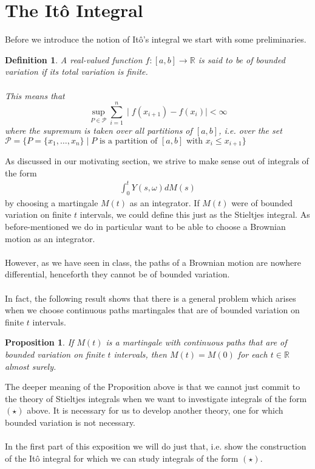 \documentclass[11pt,a4paper, final]{article}
\newtheorem{prop}{Proposition}[section]
\newtheorem{defn}{Definition}[section]
\begin{document}
\section{The Itô Integral}
Before we introduce the notion of Itô's integral we start with some preliminaries.
\begin{defn}
A real-valued function $f: [a,b] \rightarrow \mathbb{R}$ is said to be of \textit{bounded variation} if its total variation is finite.\\
\\ This means that 
$$ \sup_{P \in \mathcal{P}} \sum \limits_{i=1}^n \mid f(x_{i+1})-f(x_i)\mid < \infty $$
where the supremum is taken over all partitions of $[a,b]$, i.e. over the set \\  $\mathcal{P}= \lbrace P = \lbrace x_1 , \dots , x_n \rbrace \mid P \text{ is a partition of $[a,b]$ with $x_i \leq x_{i+1}$} \rbrace$
\end{defn}

\noindent As discussed in our motivating section, we strive to make sense out of integrals of the form 
\begin{align*}
\int_0^t Y(s, \omega) dM(s) \tag{$\star$} 
\end{align*} by choosing a martingale $M(t)$ as an integrator. If $M(t)$ were of bounded variation on finite $t$ intervals, we could define this just as the Stieltjes integral. As before-mentioned we do in particular want to be able to choose a Brownian motion as an integrator. 
\\\\
However, as we have seen in class, the paths of a Brownian motion are nowhere differential, henceforth they cannot be of bounded variation. \\
\\
In fact, the following result shows that there is a general problem which arises when we choose continuous paths martingales that are of bounded variation on finite $t$ intervals.
\begin{prop}  \label{first Prop}
If $M(t)$ is a martingale with continuous paths that are of bounded variation on finite $t$ intervals, then $M(t) = M(0)$ for each $t \in \mathbb{R}$ almost surely.
\end{prop}
\noindent The deeper meaning of the Proposition above is that we cannot just commit to the theory of Stieltjes integrals when we want to investigate integrals of the form $(\star)$ above. It is necessary for us to develop another theory, one for which bounded variation is not necessary. 
\\\\
In the first part of this exposition we will do just that, i.e. show the construction of the Itô integral for which we can study integrals of the form $(\star)$. 
\newpage 
\end{document}
